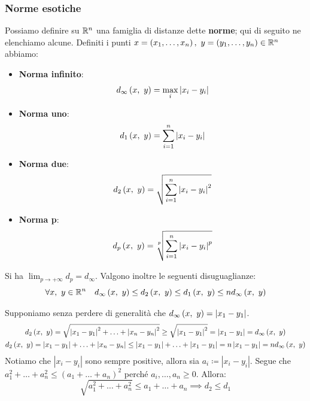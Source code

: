 \subsubsection{Norme esotiche}
Possiamo definire su $\mathbb{R}^n$ una famiglia di distanze dette \textbf{norme}; qui di seguito ne elenchiamo alcune. Definiti i punti $x=\left(x_1,\ldots, x_n\right),\ y=\left(y_1,\ldots, y_n\right)\in\realset^n$ abbiamo:
\begin{multicols}{2}
	\begin{itemize}
	\item \textbf{Norma infinito}:
	\[d_\infty\left(x,\ y\right)=\max_{i}{\left|x_i-y_i\right|}\]
	\item \textbf{Norma uno}:
	\[d_1\left(x,\ y\right)=\sum_{i=1}^{n}\left|x_i-y_i\right|\]
\end{itemize}
\begin{itemize}
	\item \textbf{Norma due}:
	\[d_2\left(x,\ y\right)=\sqrt{\sum_{i=1}^{n}\left|x_i-y_i\right|^2}\]
	\item \textbf{Norma p}:
	\[\mvf{d_p}{x}{y}=\sqrt[\leftroot{1}\uproot{3}p]{\sum_{i=1}^{n}\left|x_i-y_i\right|^p}\]
\end{itemize}
\end{multicols}
\noindent Si ha $\displaystyle \lim_{p \to +\infty}d_p=d_\infty$. Valgono inoltre le seguenti disuguaglianze:
\begin{equation}
\forall x,\ y\in\mathbb{R}^n\quad d_\infty\left(x,\ y\right)\leq d_2\left(x,\ y\right)\leq d_1\left(x,\ y\right)\leq nd_\infty\left(x,\ y\right)
\end{equation}
\vspace{-6mm}
\begin{demonstration}
Supponiamo senza perdere di generalità che $d_\infty\left(x,\ y\right)=\left|x_1-y_1\right|$.
\begin{gather*}
d_2\left(x,\ y\right)=\sqrt{\left|x_1-y_1\right|^2+\ldots+\left|x_n-y_n\right|^2}\geq\sqrt{\left|x_1-y_1\right|^2}=\left|x_1-y_1\right|=d_\infty\left(x,\ y\right)\\
d_2\left(x,\ y\right)=\left|x_1-y_1\right|+\ldots+\left|x_n-y_n\right|\leq\left|x_1-y_1\right|+\ldots+\left|x_1-y_1\right|=n\left|x_1-y_1\right|=nd_\infty\left(x,\ y\right)
\end{gather*}
Notiamo che $\left|x_i-y_i\right|$ sono sempre positive, allora sia $a_i\coloneqq\left|x_i-y_i\right|$. Segue che $a_1^2+\ldots+a_n^2\leq (a_1+\ldots+a_n)^2$ perché $a_i,\ldots,a_n\geq0$. Allora:
\begin{equation*}
\sqrt{a_1^2+\ldots+a_n^2}\leq a_1+\ldots+a_n\implies d_2\leq d_1
\end{equation*}
\vspace{-6mm}
\end{demonstration}
